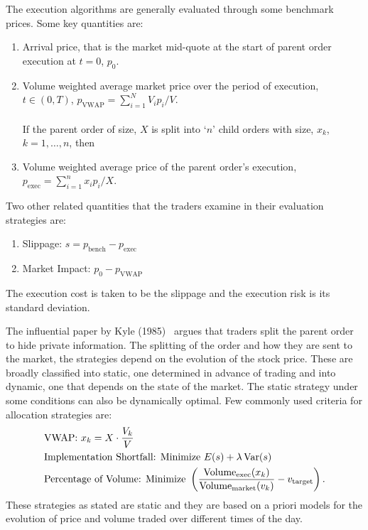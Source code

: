 The execution algorithms are generally evaluated through some benchmark prices. Some key quantities are:
	\begin{enumerate}[--]
	\item Arrival price, that is the market mid-quote at the start of parent order execution at $t=0$, $p_0$.
	\item Volume weighted average market price over the period of execution, $t \in (0,T)$, $p_{\text{VWAP}}= \sum_{i=1}^N V_ip_i/V$. \\ \\
	If the parent order of size, $X$ is split into `$n$' child orders with size, $x_k$, $k=1,\ldots,n$, then
	\item Volume weighted average price of the parent order's execution, $p_{\text{exec}}= \sum_{i=1}^n x_ip_i/X$. 
	\end{enumerate}
	
Two other related quantities that the traders examine in their evaluation strategies are:
	\begin{enumerate}[--]
	\item Slippage: $s= p_{\text{bench}} - p_{\text{exec}}$
	\item Market Impact: $p_0 - p_{\text{VWAP}}$
	\end{enumerate}
The execution cost is taken to be the slippage and the execution risk is its standard deviation. 


The influential paper by Kyle (1985)~\cite{kyle1985} argues that traders split the parent order to hide private information. The splitting of the order and how they are sent to the market, the strategies depend on the evolution of the stock price. These are broadly classified into static, one determined in advance of trading and into dynamic, one that depends on the state of the market. The static strategy under some conditions can also be dynamically optimal. Few commonly used criteria for allocation strategies are:
	\[
	\begin{split}
	&\text{VWAP: } x_k= X \cdot \dfrac{V_k}{V} \\
	&\text{Implementation Shortfall: Minimize } E(s) + \lambda \operatorname{Var}(s) \\
	&\text{Percentage of Volume: Minimize } \left( \dfrac{\text{Volume}_{\text{exec}}(x_k)}{\text{Volume}_{\text{market}}(v_k)} - v_{\text{target}} \right).
	\end{split}
	\]
These strategies as stated are static and they are based on a priori models for the evolution of price and volume traded over different times of the day. 


